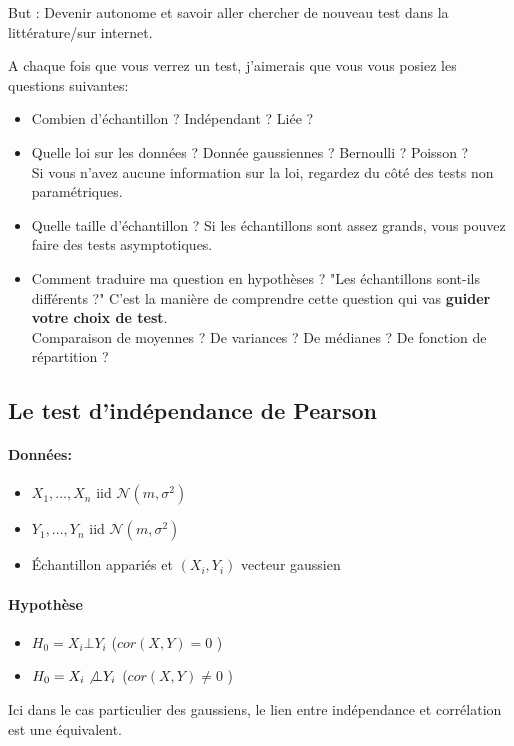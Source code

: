 \documentclass{article}
\theoremstyle{plain}%
\theoremstyle{definition}
\theoremstyle{remark}
\begin{document}
But : Devenir autonome et savoir aller chercher de nouveau test dans la littérature/sur internet. 

A chaque fois que vous verrez un test, j'aimerais que vous vous posiez les questions suivantes:
\begin{itemize}
    \item Combien d'échantillon ? Indépendant ? Liée ?
    \item Quelle loi sur les données ? Donnée gaussiennes ? Bernoulli ? Poisson ? \\
            Si vous n'avez aucune information sur la loi, regardez du côté des tests non paramétriques.
    \item Quelle taille d'échantillon ? Si les échantillons sont assez grands, vous pouvez faire des tests asymptotiques.
    \item Comment traduire ma question en hypothèses ? "Les échantillons sont-ils différents ?" C'est la manière de comprendre cette question qui vas \textbf{guider votre choix de test}. \\ 
        Comparaison de moyennes ? De variances ? De médianes ? De fonction de répartition ? 
\end{itemize}

\subsection{Le test d'indépendance de Pearson}
\paragraph*{Données:} \begin{itemize}
    \item $ X_1, \dots, X_n $ iid $ \mathcal{N}(m,\sigma ^2) $ 
    \item $ Y_1, \dots, Y_n $ iid $ \mathcal{N}(m,\sigma ^2) $ 
    \item Échantillon appariés et $ (X_i,Y_i) $ vecteur gaussien 
\end{itemize}

\paragraph*{Hypothèse}\begin{itemize}
    \item $ H_0 = X_i \bot Y_i $ ($ cor(X,Y) = 0 $ )
    \item $ H_0 = X_i \not\bot Y_i $ ($ cor(X,Y) \neq 0 $ )
\end{itemize}
Ici dans le cas particulier des gaussiens, le lien entre indépendance et corrélation est une équivalent.
\end{document}
